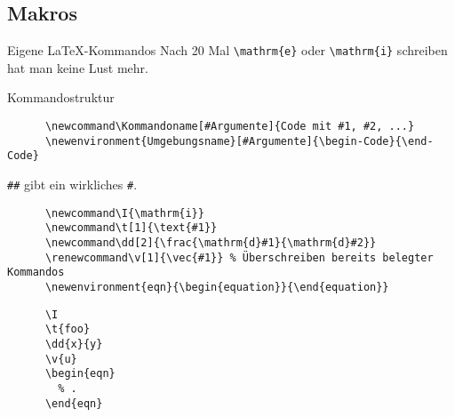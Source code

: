 \subsection{Makros}

\begin{frame}[fragile]{Eigene \LaTeX-Kommandos}
  Nach 20 Mal \lstinline+\mathrm{e}+ oder \lstinline+\mathrm{i}+ schreiben hat man keine Lust mehr.
  \begin{tblock}{Kommandostruktur}
    \begin{lstlisting}
      \newcommand\Kommandoname[#Argumente]{Code mit #1, #2, ...}
      \newenvironment{Umgebungsname}[#Argumente]{\begin-Code}{\end-Code}
    \end{lstlisting}
  \end{tblock}
  \verb+##+ gibt ein wirkliches \verb+#+.
  \begin{CodeExample}{0.75}
    \begin{lstlisting}
      \newcommand\I{\mathrm{i}}
      \newcommand\t[1]{\text{#1}}
      \newcommand\dd[2]{\frac{\mathrm{d}#1}{\mathrm{d}#2}}
      \renewcommand\v[1]{\vec{#1}} % Überschreiben bereits belegter Kommandos
      \newenvironment{eqn}{\begin{equation}}{\end{equation}}
    \end{lstlisting}
  \CodeResult
    \begin{lstlisting}
      \I
      \t{foo}
      \dd{x}{y}
      \v{u}
      \begin{eqn}
        % .
      \end{eqn}
    \end{lstlisting}
  \end{CodeExample}
\end{frame}


